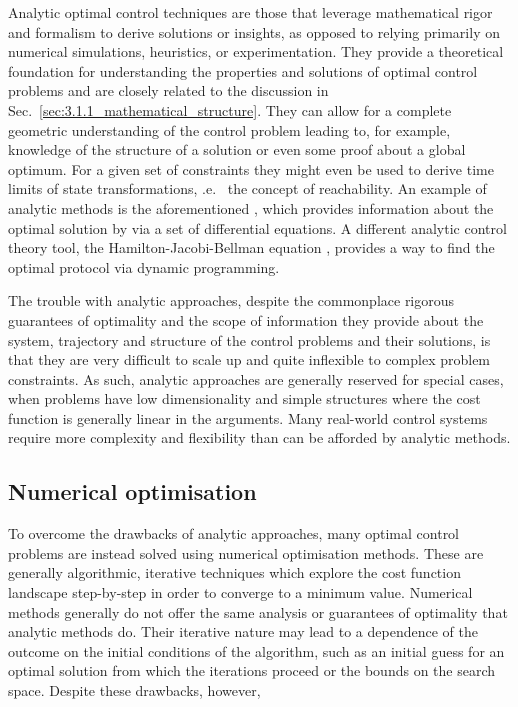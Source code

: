 Analytic optimal control techniques are those that leverage mathematical rigor and formalism to derive solutions or insights, as opposed to relying primarily on numerical simulations, heuristics, or experimentation. They provide a theoretical foundation for understanding the properties and solutions of optimal control problems and are closely related to the discussion in Sec.~\ref{sec:3.1.1_mathematical_structure}. They can allow for a complete geometric understanding of the control problem leading to, for example, knowledge of the structure of a solution or even some proof about a global optimum. For a given set of constraints they might even be used to derive time limits of state transformations, \@i.e.~ the concept of reachability. An example of analytic methods is the aforementioned , which provides information about the optimal solution by via a set of differential equations. A different analytic control theory tool, the Hamilton-Jacobi-Bellman equation \cite{yong_dynamic_1999}, provides a way to find the optimal protocol via dynamic programming\cite{sniedovich_dynamic_2010}.

The trouble with analytic approaches, despite the commonplace rigorous guarantees of optimality and the scope of information they provide about the system, trajectory and structure of the control problems and their solutions, is that they are very difficult to scale up and quite inflexible to complex problem constraints. As such, analytic approaches are generally reserved for special cases, when problems have low dimensionality and simple structures where the cost function is generally linear in the arguments. Many real-world control systems require more complexity and flexibility than can be afforded by analytic methods.

\subsection{Numerical optimisation}\label{sec:3.1.3_numerical_optimisation}

To overcome the drawbacks of analytic approaches, many optimal control problems are instead solved using numerical optimisation methods. These are generally algorithmic, iterative  techniques which explore the cost function landscape step-by-step in order to converge to a minimum value. Numerical methods generally do not offer the same analysis or guarantees of optimality that analytic methods do. Their iterative nature may lead to a dependence of the outcome on the initial conditions of the algorithm, such as an initial guess for an optimal solution from which the iterations proceed or the bounds on the search space. Despite these drawbacks, however, 

